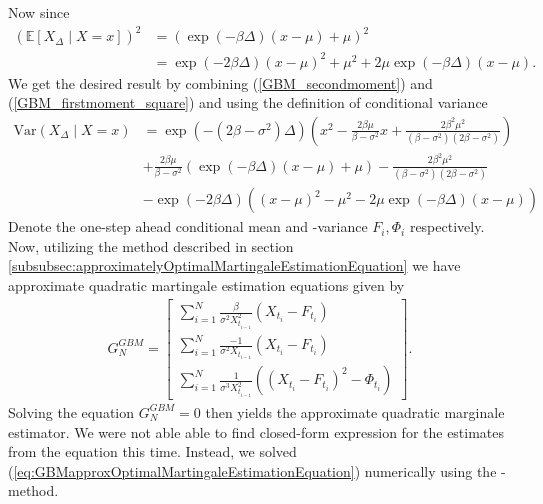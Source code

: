 Now since 
\begin{align}
    \left(\mathbb{E}\left[X_\Delta\middle|X=x\right]\right)^2 &= \left(\exp\left(-\beta\Delta\right)\left(x-\mu\right) + \mu\right)^2 \nonumber\\
    &= \exp\left(-2\beta\Delta\right)\left(x-\mu\right)^2 + \mu^2 + 2\mu\exp\left(-\beta\Delta\right)\left(x-\mu\right). \label{GBM_firstmoment_square}
\end{align}
We get the desired result by combining (\ref{GBM_secondmoment}) and (\ref{GBM_firstmoment_square}) and using the definition of conditional variance
\begin{align}
    \mathrm{Var}\left(X_\Delta \middle| X = x\right) &= \exp\left(-\left(2\beta - \sigma^2\right)\Delta\right)\left(x^2 - \frac{2\beta\mu}{\beta-\sigma^2}x + \frac{2\beta^2 \mu^2}{\left(\beta-\sigma^2\right)\left(2\beta - \sigma^2\right)}\right) \nonumber \\
    &+ \frac{2\beta\mu}{\beta-\sigma^2}\left(\exp\left(-\beta\Delta\right)\left(x-\mu\right) + \mu\right) - \frac{2\beta^2\mu^2}{\left(\beta-\sigma^2\right)\left(2\beta - \sigma^2\right)} \nonumber\\
    &- \exp\left(-2\beta\Delta\right)\left(\left(x-\mu\right)^2 - \mu^2 - 2\mu\exp\left(-\beta\Delta\right)\left(x-\mu\right)\right)
\end{align} 
Denote the one-step ahead conditional mean and -variance $F_i, \Phi_i$ respectively. Now, utilizing the method described in section \ref{subsubsec:approximatelyOptimalMartingaleEstimationEquation} we have approximate quadratic martingale estimation equations given by
\begin{align}
    G_N^{GBM} = \begin{bmatrix}
        \sum_{i = 1}^N \frac{\beta}{\sigma^2 X_{t_{i-1}}^2}\left(X_{t_i} - F_{t_i}\right)\\
        \sum_{i = 1}^N \frac{-1}{\sigma^2 X_{t_{i-1}}}\left(X_{t_i} - F_{t_i}\right)\\
        \sum_{i = 1}^N \frac{1}{\sigma^3 X_{t_{i-1}}^2}\left(\left(X_{t_i} - F_{t_i}\right)^2 - \Phi_{t_i}\right)
    \end{bmatrix}. \label{eq:GBMapproxOptimalMartingaleEstimationEquation}
\end{align}
Solving the equation $G_N^{GBM} = 0$ then yields the approximate quadratic marginale estimator. We were not able able to find closed-form expression for the estimates from the equation this time. Instead, we solved (\ref{eq:GBMapproxOptimalMartingaleEstimationEquation}) numerically using the -method\cite{nleqslv}.
